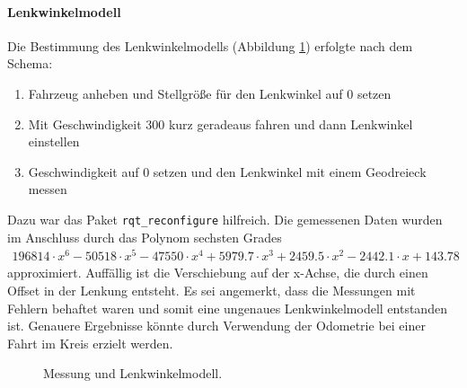 \paragraph{Lenkwinkelmodell}
Die Bestimmung des Lenkwinkelmodells (Abbildung \ref{fig:Lenkwinkelmodell}) erfolgte nach dem Schema:
\begin{enumerate}
	\item Fahrzeug anheben und Stellgr\"o\ss{}e f\"ur den Lenkwinkel auf 0 setzen
	\item Mit Geschwindigkeit 300 kurz geradeaus fahren und dann Lenkwinkel einstellen
	\item Geschwindigkeit auf 0 setzen und den Lenkwinkel mit einem Geodreieck messen
\end{enumerate}
Dazu war das Paket \texttt{rqt\_reconfigure} hilfreich. Die gemessenen Daten wurden im Anschluss durch das Polynom sechsten Grades
\begin{align*}
196814\cdot x^6 - 50518\cdot x^5 - 47550\cdot x^4 + 5979.7\cdot x^3 + 2459.5\cdot x^2 - 2442.1\cdot x + 143.78
\end{align*} 
approximiert.
Auff\"allig ist die Verschiebung auf der x-Achse, die durch einen Offset in der Lenkung entsteht. Es sei angemerkt, dass die Messungen mit Fehlern behaftet waren und somit eine ungenaues Lenkwinkelmodell entstanden ist. Genauere Ergebnisse k\"onnte durch Verwendung der Odometrie bei einer Fahrt im Kreis erzielt werden.
\begin{figure}[h]
	\centering
	\caption{Messung und Lenkwinkelmodell.}
	\label{fig:Lenkwinkelmodell}
\end{figure}